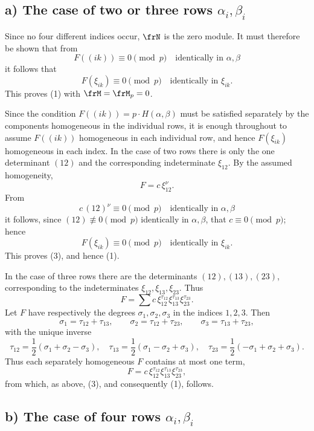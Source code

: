\documentclass[11pt]{article}
\begin{document}
\subsection*{a) The case of two or three rows \(\alpha_i,\beta_i\)}

Since no four different indices occur, \(\frN\) is the zero module. It must therefore be shown that from
\begin{equation}
        F((ik))\equiv0\pmod p\quad \text{identically in \(\alpha,\beta\)}
\end{equation}
it follows that
\[
        F(\xi_{ik})\equiv0\pmod p\quad \text{identically in \(\xi_{ik}\)}.
\]
This proves (1) with \(\frM=\frM_p=0\).

Since the condition \(F((ik))=p\cdot H(\alpha,\beta)\) must be satisfied separately by the components homogeneous in the individual rows, it is enough throughout to assume \(F((ik))\) homogeneous in each individual row, and hence \(F(\xi_{ik})\) homogeneous in each index. In the case of two rows there is only the one determinant \((12)\) and the corresponding indeterminate \(\xi_{12}\). By the assumed homogeneity,
\[
        F=c\,\xi_{12}^\nu.
\]
From
\[
        c\,(12)^\nu\equiv0\pmod p\quad \text{identically in \(\alpha,\beta\)}
\]
it follows, since \((12)\not\equiv0\pmod p\) identically in \(\alpha,\beta\), that \(c\equiv0\pmod p\); hence
\[
        F(\xi_{ik})\equiv0\pmod p\quad \text{identically in \(\xi_{ik}\)}.
\]
This proves (3), and hence (1).

In the case of three rows there are the determinants \((12),(13),(23)\), corresponding to the indeterminates \(\xi_{12},\xi_{13},\xi_{23}\). Thus
\[
        F=\sum c\,\xi_{12}^{\tau_{12}}\xi_{13}^{\tau_{13}}\xi_{23}^{\tau_{23}}.
\]
Let \(F\) have respectively the degrees \(\sigma_1,\sigma_2,\sigma_3\) in the indices \(1,2,3\). Then
\[
        \sigma_1=\tau_{12}+\tau_{13},\qquad
        \sigma_2=\tau_{12}+\tau_{23},\qquad
        \sigma_3=\tau_{13}+\tau_{23},
\]
with the unique inverse
\[
        \tau_{12}=\frac12(\sigma_1+\sigma_2-\sigma_3),\quad
        \tau_{13}=\frac12(\sigma_1-\sigma_2+\sigma_3),\quad
        \tau_{23}=\frac12(-\sigma_1+\sigma_2+\sigma_3).
\]
Thus each separately homogeneous \(F\) contains at most one term,
\[
        F=c\,\xi_{12}^{\tau_{12}}\xi_{13}^{\tau_{13}}\xi_{23}^{\tau_{23}},
\]
from which, as above, (3), and consequently (1), follows.

\subsection*{b) The case of four rows \(\alpha_i,\beta_i\)}
\end{document}

